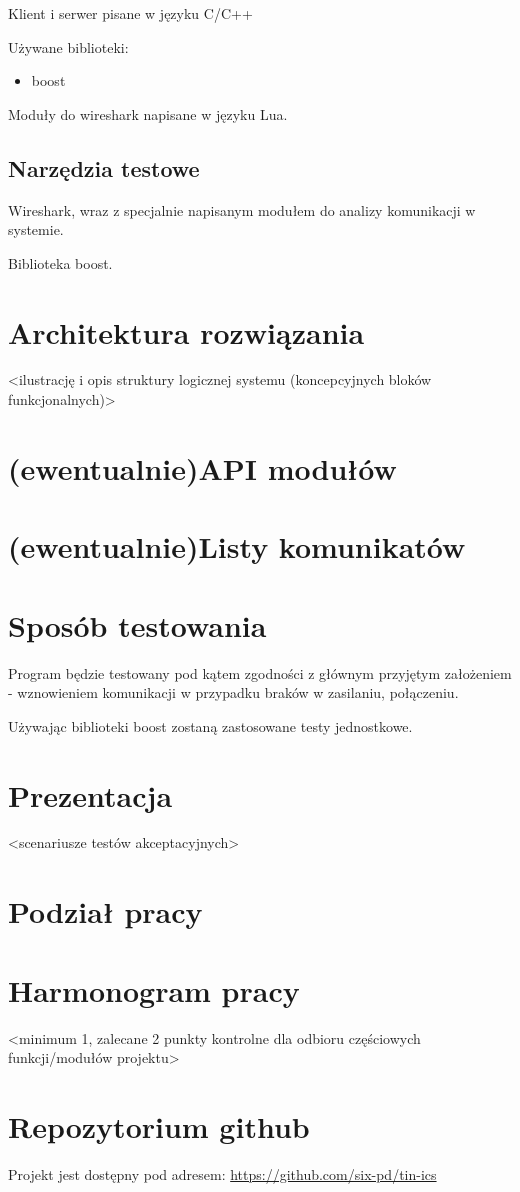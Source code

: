 \documentclass{article}
\begin{document}
Klient i serwer pisane w języku C/C++


Używane biblioteki:
\begin{itemize}

\item boost

\end{itemize}


Moduły do wireshark napisane w języku Lua.

\subsection{Narzędzia testowe}

Wireshark, wraz z specjalnie napisanym modułem do analizy komunikacji w systemie.

Biblioteka boost.

\section{Architektura rozwiązania\label{arch}}

<ilustrację i opis struktury logicznej systemu (koncepcyjnych bloków funkcjonalnych)>

\section{(ewentualnie)API modułów\label{api}}

\section{(ewentualnie)Listy komunikatów\label{kom}}

\section{Sposób testowania\label{test}}

Program będzie testowany pod kątem zgodności z głównym przyjętym założeniem - wznowieniem komunikacji w przypadku braków w zasilaniu, połączeniu.

Używając biblioteki boost zostaną zastosowane testy jednostkowe.

\section{Prezentacja\label{prez}}

<scenariusze testów akceptacyjnych>

\section{Podział pracy\label{prac}}

\section{Harmonogram pracy\label{harm}}

<minimum 1, zalecane 2 punkty kontrolne dla odbioru częściowych funkcji/modułów projektu>

\section{Repozytorium github\label{git}}

Projekt jest dostępny pod adresem: \url{https://github.com/six-pd/tin-ics}
\end{document}
